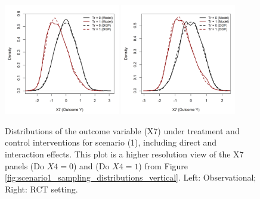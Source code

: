 \begin{figure}[htbp]
\centering
\includegraphics[width=0.45\textwidth]{img/results/observ_scenario1_X7_treatment_densities.png}
\includegraphics[width=0.45\textwidth]{img/results/rct_scenario1_X7_treatment_densities.png}
\caption{Distributions of the outcome variable (X7) under treatment and control interventions for scenario (1), including direct and interaction effects. This plot is a higher resolution view of the X7 panels (Do $X4=0$) and (Do $X4=1$) from Figure \ref{fig:scenario1_sampling_distributions_vertical}. Left: Observational; Right: RCT setting.}
\label{fig:scenario1_outcome_distributions}
\end{figure}




